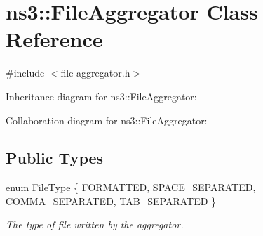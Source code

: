 \hypertarget{classns3_1_1FileAggregator}{}\section{ns3\+:\+:File\+Aggregator Class Reference}
\label{classns3_1_1FileAggregator}


{\ttfamily \#include $<$file-\/aggregator.\+h$>$}



Inheritance diagram for ns3\+:\+:File\+Aggregator\+:


Collaboration diagram for ns3\+:\+:File\+Aggregator\+:
\subsection*{Public Types}
\begin{DoxyCompactItemize}
\item 
enum \hyperlink{classns3_1_1FileAggregator_aedb3108205a498f7ac0c564508067e2d}{File\+Type} \{ \hyperlink{classns3_1_1FileAggregator_aedb3108205a498f7ac0c564508067e2da7e34fea5d3f680d09518ee58ce4711f0}{F\+O\+R\+M\+A\+T\+T\+ED}, 
\hyperlink{classns3_1_1FileAggregator_aedb3108205a498f7ac0c564508067e2daa06fea1225d5be6eefc92c12abc4bd0b}{S\+P\+A\+C\+E\+\_\+\+S\+E\+P\+A\+R\+A\+T\+ED}, 
\hyperlink{classns3_1_1FileAggregator_aedb3108205a498f7ac0c564508067e2da8202ef65d363368b0110c3e6534bfbb7}{C\+O\+M\+M\+A\+\_\+\+S\+E\+P\+A\+R\+A\+T\+ED}, 
\hyperlink{classns3_1_1FileAggregator_aedb3108205a498f7ac0c564508067e2daf3ec5f42debcff6d7616bf1428d67bed}{T\+A\+B\+\_\+\+S\+E\+P\+A\+R\+A\+T\+ED}
 \}\begin{DoxyCompactList}\small\item\em The type of file written by the aggregator. \end{DoxyCompactList}
\end{DoxyCompactItemize}
